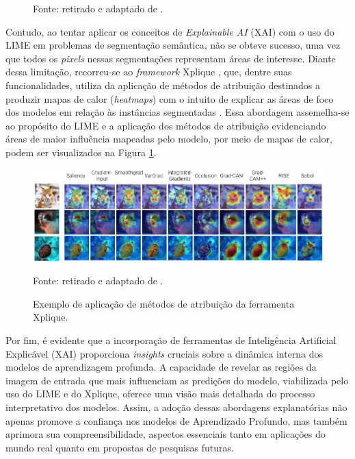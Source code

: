 \begin{figure}[H]
    Fonte: retirado e adaptado de \cite{Ribeiro2016WhyClassifier}.
\end{figure}

Contudo, ao tentar aplicar os conceitos de \textit{Explainable AI} (XAI) com o uso do LIME em problemas de segmentação semântica, não se obteve sucesso, uma vez que todos os \textit{pixels} nessas segmentações representam áreas de interesse. Diante dessa limitação, recorreu-se ao \textit{framework} Xplique \citep{Fel2022}, que, dentre suas funcionalidades, utiliza da aplicação de métodos de atribuição destinados a produzir mapas de calor (\textit{heatmaps}) com o intuito de explicar as áreas de foco dos modelos em relação às instâncias segmentadas \citep{Fel2022}. Essa abordagem assemelha-se ao propósito do LIME e a aplicação dos métodos de atribuição evidenciando áreas de maior influência mapeadas pelo modelo, por meio de mapas de calor, podem ser visualizados na Figura \ref{project:fig:explain:xplique}.

\begin{figure}[H]
    \centering
    \caption[Aplicação de métodos de atribuição do Xplique.]{Exemplo de aplicação de métodos de atribuição da ferramenta Xplique.}
    \includegraphics[width=1\textwidth]{recursos/imagens/project/xplique.png}
    \label{project:fig:explain:xplique}

    Fonte: retirado e adaptado de \cite{Fel2022}.
\end{figure}


Por fim, é evidente que a incorporação de ferramentas de Inteligência Artificial Explicável (XAI) proporciona \textit{insights} cruciais sobre a dinâmica interna dos modelos de aprendizagem profunda. A capacidade de revelar as regiões da imagem de entrada que mais influenciam as predições do modelo, viabilizada pelo uso do LIME e do Xplique, oferece uma visão mais detalhada do processo interpretativo dos modelos. Assim, a adoção dessas abordagens explanatórias não apenas promove a confiança nos modelos de Aprendizado Profundo, mas também aprimora sua compreensibilidade, aspectos essenciais tanto em aplicações do mundo real quanto em propostas de pesquisas futuras.


